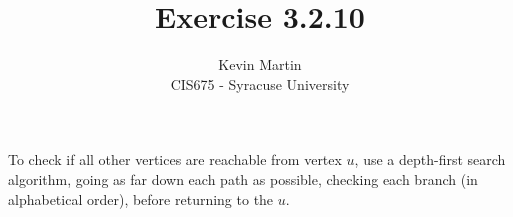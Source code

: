 \documentclass{article}
\author{Kevin Martin\\ CIS675 - Syracuse University}
\title{Exercise 3.2.10}
\begin{document}
\maketitle
To check if all other vertices are reachable from vertex $u$, use a depth-first search algorithm,
going as far down each path as possible, checking each branch (in alphabetical order),
before returning to the $u$.
\end{document}

